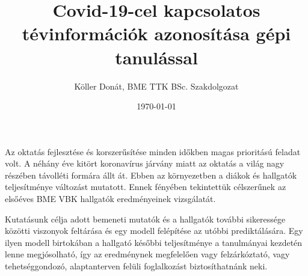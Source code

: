 \documentclass[12pt]{article}
\title{Covid-19-cel kapcsolatos tévinformációk azonosítása gépi tanulással}
\author{Köller Donát, BME TTK BSc. Szakdolgozat}
\date{\today}
\begin{document}


Az oktatás fejlesztése és korszerűsítése minden időkben magas prioritású feladat volt. A néhány éve kitört koronavírus járvány miatt az oktatás a világ nagy részében távolléti formára állt át. Ebben az környezetben a diákok és hallgatók teljesítménye változást mutatott. Ennek fényében tekintettük célszerűnek az elsőéves BME VBK hallgatók eredményeinek vizsgálatát.

Kutatásunk célja adott bemeneti mutatók és a hallgatók további sikeressége közötti viszonyok feltárása és egy modell felépítése az utóbbi prediktálására. Egy ilyen modell birtokában a hallgató későbbi teljesítménye a tanulmányai kezdetén lenne megjósolható, így az eredménynek megfelelően vagy felzárkóztató, vagy tehetséggondozó, alaptanterven felüli foglalkozást biztosíthatnánk neki.
\end{document}
